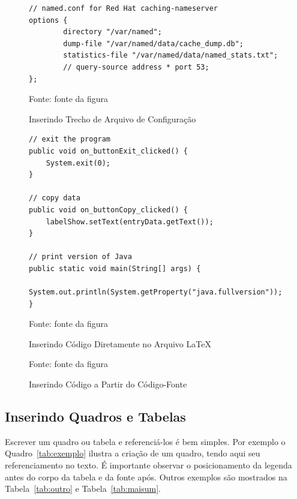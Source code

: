 \begin{figure}[!htb]
\centering
\caption{Inserindo Trecho de Arquivo de Configuração} %
\begin{Verbatim}[fontsize=\small]
// named.conf for Red Hat caching-nameserver
options {
        directory "/var/named";
        dump-file "/var/named/data/cache_dump.db";
        statistics-file "/var/named/data/named_stats.txt";
        // query-source address * port 53;
};
\end{Verbatim} 
{\small Fonte: fonte da figura} %
\label{fig:exemploconfig} %
\end{figure}


\begin{figure}[!htb]
\centering
\caption{Inserindo Código Diretamente no Arquivo \LaTeX} %
\begin{lstlisting}
// exit the program
public void on_buttonExit_clicked() {
	System.exit(0);
}

// copy data
public void on_buttonCopy_clicked() {
	labelShow.setText(entryData.getText());
}

// print version of Java
public static void main(String[] args) {
	System.out.println(System.getProperty("java.fullversion"));
}
\end{lstlisting} 
{\small Fonte: fonte da figura} %
\label{fig:exemplocodigo1} %
\end{figure}


\begin{figure}[H]
\centering
\caption{Inserindo Código a Partir do Código-Fonte} %
\label{fig:exemplocodigo2} %
{\small Fonte: fonte da figura} %
\end{figure}

\subsection{Inserindo Quadros e Tabelas}

Escrever um quadro ou tabela e referenciá-los é bem simples. Por exemplo o Quadro~\ref{tab:exemplo} ilustra a criação de um quadro, tendo aqui seu referenciamento no texto. É importante observar o posicionamento da legenda antes do corpo da tabela e da fonte após. Outros exemplos são mostrados na Tabela~\ref{tab:outro} e Tabela~\ref{tab:maisum}.

